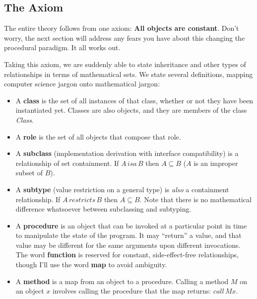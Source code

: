 \documentclass[12pt]{article}
\begin{document}
\subsection{The Axiom}

The entire theory follows from one axiom: \textbf{All objects are
constant}.  Don't worry, the next section will address any fears you
have about this changing the procedural paradigm.  It all works out.

Taking this axiom, we are suddenly able to state inheritance and other
types of relationships in terms of mathematical sets.  We state several
definitions, mapping computer science jargon onto mathematical jargon:

\begin{itemize}
\item A \textbf{class} is the set of all instances of that class,
whether or not they have been instantiated yet.  Classes are also
objects, and they are members of the class \textit{Class}.

\item A \textbf{role} is the set of all objects that compose that role.

\item A \textbf{subclass} (implementation derivation with interface
compatibility) is a relationship of set containment.  If $A \,
\mathit{isa} \, B$ then $A \subseteq B$ ($A$ is an improper subset of
$B$).

\item A \textbf{subtype} (value restriction on a general type) is
\textit{also} a containment relationship.  If $A \, \mathit{restricts}
\, B$ then $A \subseteq B$.  Note that there is no mathematical
difference whatsoever between subclassing and subtyping.

\item A \textbf{procedure} is an object that can be invoked at a
particular point in time to manipulate the state of the program.  It may
``return'' a value, and that value may be different for the same
arguments upon different invocations.  The word \textbf{function} is
reserved for constant, side-effect-free relationships, though I'll use
the word \textbf{map} to avoid ambiguity.

\item A \textbf{method} is a map from an object to a procedure.  Calling
a method $M$ on an object $x$ involves calling the procedure that the
map returns: $\mathit{call}\,Mx$.

\end{itemize}
\end{document}
